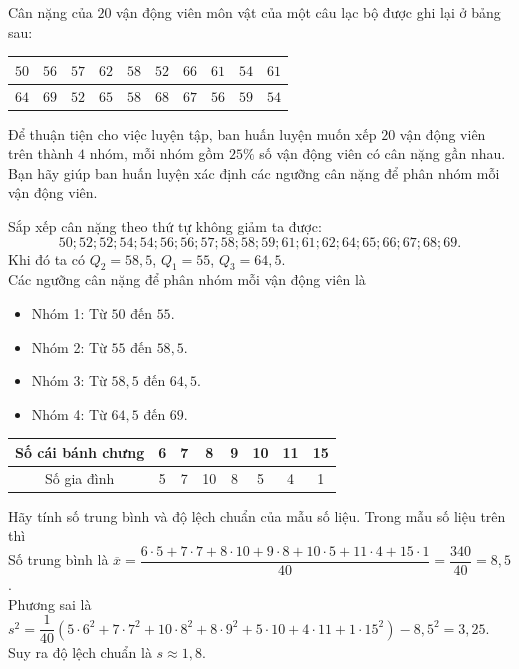 \begin{bt}%
	Cân nặng của $20$ vận động viên môn vật của một câu lạc bộ được ghi lại ở bảng sau:
	\begin{center}
		\begin{tabular}{|c|c|c|c|c|c|c|c|c|c|}
			\hline
			$50$	& $56$ & $57$ &$62$ & $58$ & $52$ &$66$ & $61$ & $54$ &$61$\\ \hline
			$64$ & $69$ &$52$ & $65$ & $58$ &$68$& $67$ & $56$ &$59$&$54$\\
			\hline
		\end{tabular}  
	\end{center}
	Để thuận tiện cho việc luyện tập, ban huấn luyện muốn xếp $20$ vận động viên trên thành $4$ nhóm, mỗi nhóm gồm $25\%$ số vận động viên có cân nặng gần nhau. Bạn hãy giúp ban huấn luyện xác định các ngưỡng cân nặng để phân nhóm mỗi vận động viên. 	
	\loigiai
	{
		Sắp xếp cân nặng theo thứ tự không giảm ta được:
		$$50;52;52;54;54;56;56;57;58;58;59;61;61;62;64;65;66;67;68;69.$$	
		Khi đó ta có $Q_2=58{,}5$, $Q_1=55$, $Q_3=64{,}5$.\\
		Các ngưỡng cân nặng để phân nhóm mỗi vận động viên là
		\begin{itemize}
			\item Nhóm 1: Từ $50$ đến $55$.
			\item Nhóm 2: Từ $55$ đến $58{,}5$.
			\item Nhóm 3: Từ $58{,}5$ đến $64{,}5$.
			\item Nhóm 4: Từ $64{,}5$ đến $69$.
		\end{itemize}	
	}
\end{bt}

\begin{bt}%
	\begin{center}
		\begin{tabular}{|c|c|c|c|c|c|c|c|}
			\hline
			Số cái bánh chưng & 6  & 7 & 8 & 9 & 10 & 11 & 15 \\
			\hline
			Số gia đình & 5 & 7 & 10 & 8 & 5 & 4 & 1 \\
			\hline
		\end{tabular} 
	\end{center}
	Hãy tính số trung bình và độ lệch chuẩn của mẫu số liệu. 
	\loigiai
	{Trong mẫu số liệu trên thì \\
		Số trung bình là $\overline{x} = \dfrac{6 \cdot 5 + 7 \cdot 7 + 8 \cdot 10 + 9 \cdot 8 + 10 \cdot 5 + 11 \cdot 4 + 15 \cdot 1}{40} = \dfrac{340}{40} = 8{,}5$. \\
		Phương sai là $s^2 = \dfrac{1}{40}(5 \cdot 6^2 + 7 \cdot 7^2 + 10 \cdot 8^2 + 8 \cdot 9^2 + 5 \cdot 10 + 4 \cdot 11 + 1 \cdot 15^2) - 8{,}5^2 = 3{,}25$. \\
		Suy ra độ lệch chuẩn là $s \approx 1{,}8$.} 
\end{bt}

